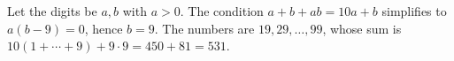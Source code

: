 Let the digits be $a,b$ with $a>0$. The condition $a+b+ab=10a+b$ simplifies to $a(b-9)=0$, hence $b=9$. The numbers are $19,29,\ldots,99$, whose sum is $10(1+\cdots+9)+9\cdot 9=450+81=\boxed{531}$.
